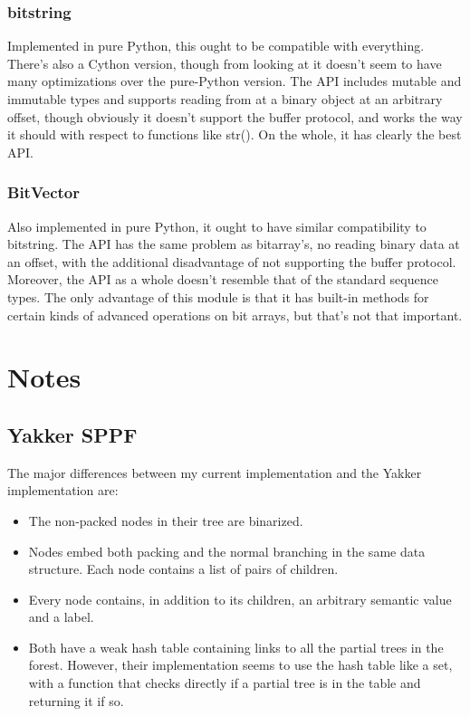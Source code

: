 \documentclass[12pt]{article}
\begin{document}
\subsubsection{bitstring}
\label{sec:bitstring}

Implemented in pure Python, this ought to be compatible with
everything.  There's also a Cython version, though from looking at it
doesn't seem to have many optimizations over the pure-Python version.
The API includes mutable and immutable types and supports reading from
at a binary object at an arbitrary offset, though obviously it doesn't
support the buffer protocol, and works the way it should with respect
to functions like str().  On the whole, it has clearly the best API.

\subsubsection{BitVector}
\label{sec:bitvector}

Also implemented in pure Python, it ought to have similar
compatibility to bitstring.  The API has the same problem as
bitarray's, no reading binary data at an offset, with the additional
disadvantage of not supporting the buffer protocol.  Moreover, the API
as a whole doesn't resemble that of the standard sequence types.  The
only advantage of this module is that it has built-in methods for
certain kinds of advanced operations on bit arrays, but that's not
that important.


\section{Notes}
\label{sec:notes}

\subsection{Yakker SPPF}
\label{sec:yakker_sppf}

The major differences between my current implementation and the Yakker
implementation are:

\begin{itemize}
\item The non-packed nodes in their tree are binarized.
\item Nodes embed both packing and the normal branching in the same
  data structure.  Each node contains a list of pairs of children.
\item Every node contains, in addition to its children, an arbitrary
  semantic value and a label.
\item Both have a weak hash table containing links to all the partial
  trees in the forest.  However, their implementation seems to use the
  hash table like a set, with a function that checks directly if a
  partial tree is in the table and returning it if so.
\end{itemize}
\end{document}
